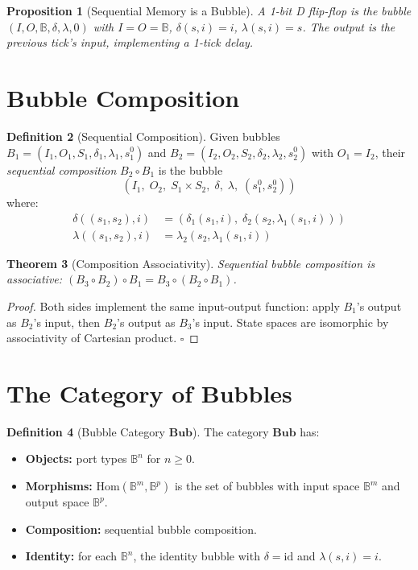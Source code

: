 \documentclass[11pt,a4paper,openany]{book}
\theoremstyle{plain}
\newtheorem{theorem}{Theorem}[chapter]
\newtheorem{proposition}[theorem]{Proposition}
\theoremstyle{definition}
\newtheorem{definition}[theorem]{Definition}
\theoremstyle{remark}
\begin{document}
\begin{proposition}[Sequential Memory is a Bubble]
  A 1-bit D flip-flop is the bubble $(I, O, \mathbb{B}, \delta, \lambda, 0)$
  with $I = O = \mathbb{B}$, $\delta(s, i) = i$, $\lambda(s, i) = s$.
  The output is the \emph{previous tick's} input, implementing a 1-tick delay.
\end{proposition}

\section{Bubble Composition}

\begin{definition}[Sequential Composition]
  Given bubbles $B_1 = (I_1, O_1, S_1, \delta_1, \lambda_1, s_1^0)$ and
  $B_2 = (I_2, O_2, S_2, \delta_2, \lambda_2, s_2^0)$ with $O_1 = I_2$,
  their \emph{sequential composition} $B_2 \circ B_1$ is the bubble
  \[
    (I_1,\; O_2,\; S_1 \times S_2,\; \delta,\; \lambda,\; (s_1^0, s_2^0))
  \]
  where:
  \begin{align*}
    \delta((s_1, s_2), i) &= (\delta_1(s_1, i),\; \delta_2(s_2, \lambda_1(s_1, i))) \\
    \lambda((s_1, s_2), i) &= \lambda_2(s_2, \lambda_1(s_1, i))
  \end{align*}
\end{definition}

\begin{theorem}[Composition Associativity]
  Sequential bubble composition is associative:
  $(B_3 \circ B_2) \circ B_1 = B_3 \circ (B_2 \circ B_1)$.
\end{theorem}
\begin{proof}
  Both sides implement the same input-output function: apply $B_1$'s
  output as $B_2$'s input, then $B_2$'s output as $B_3$'s input.
  State spaces are isomorphic by associativity of Cartesian product.
  $\square$
\end{proof}

\section{The Category of Bubbles}

\begin{definition}[Bubble Category $\mathbf{Bub}$]
  The category $\mathbf{Bub}$ has:
  \begin{itemize}
    \item \textbf{Objects:} port types $\mathbb{B}^n$ for $n \geq 0$.
    \item \textbf{Morphisms:} $\mathrm{Hom}(\mathbb{B}^m, \mathbb{B}^p)$
          is the set of bubbles with input space $\mathbb{B}^m$ and
          output space $\mathbb{B}^p$.
    \item \textbf{Composition:} sequential bubble composition.
    \item \textbf{Identity:} for each $\mathbb{B}^n$, the identity bubble
          with $\delta = \mathrm{id}$ and $\lambda(s,i) = i$.
  \end{itemize}
\end{definition}
\end{document}
